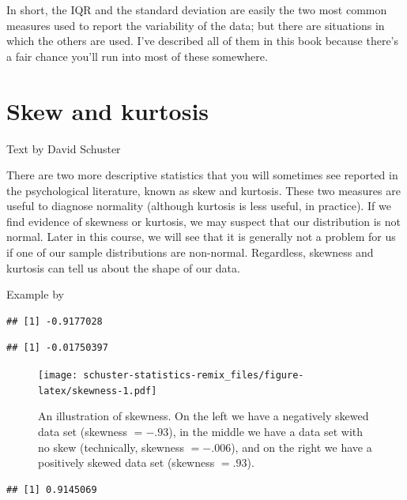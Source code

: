 \documentclass[
]{book}
\begin{document}
In short, the IQR and the standard deviation are easily the two most common measures used to report the variability of the data; but there are situations in which the others are used. I've described all of them in this book because there's a fair chance you'll run into most of these somewhere.

\hypertarget{skewandkurtosis}{%
\section{Skew and kurtosis}\label{skewandkurtosis}}

Text by David Schuster

There are two more descriptive statistics that you will sometimes see reported in the psychological literature, known as skew and kurtosis. These two measures are useful to diagnose normality (although kurtosis is less useful, in practice). If we find evidence of skewness or kurtosis, we may suspect that our distribution is not normal. Later in this course, we will see that it is generally not a problem for us if one of our sample distributions are non-normal. Regardless, skewness and kurtosis can tell us about the shape of our data.

Example by \citet{Navarro2018}

\begin{verbatim}
## [1] -0.9177028
\end{verbatim}

\begin{verbatim}
## [1] -0.01750397
\end{verbatim}

\begin{figure}
\centering
\texttt{[image: schuster-statistics-remix\_files/figure-latex/skewness-1.pdf]}
\caption{\label{fig:skewness}An illustration of skewness. On the left we have a negatively skewed data set (skewness \(= -.93\)), in the middle we have a data set with no skew (technically, skewness \(= -.006\)), and on the right we have a positively skewed data set (skewness \(= .93\)).}
\end{figure}

\begin{verbatim}
## [1] 0.9145069
\end{verbatim}
\end{document}

